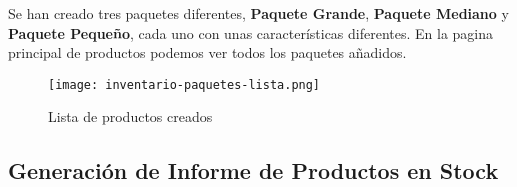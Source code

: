 Se han creado tres paquetes diferentes, \textbf{Paquete Grande}, \textbf{Paquete Mediano} y \textbf{Paquete Pequeño}, cada uno con unas características diferentes. En la pagina principal de productos podemos ver todos los paquetes añadidos.

\begin{figure}[ht]
    \centering
    \texttt{[image: inventario-paquetes-lista.png]}
    \caption{Lista de productos creados}
\end{figure}

\vspace{8ex}

\subsection{Generación de Informe de Productos en Stock}














\newpage



